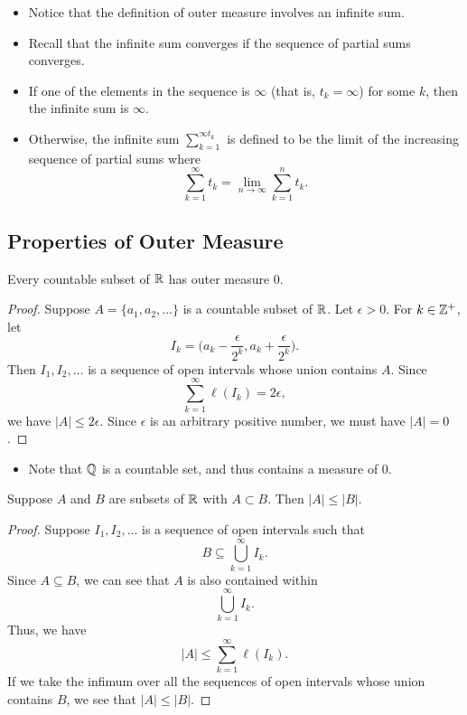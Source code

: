 \documentclass[11pt,a4paper]{book}
\begin{document}
\begin{itemize}
    \item Notice that the definition of outer measure involves an infinite sum.
    \item Recall that the infinite sum converges if the sequence of partial sums converges.
    \item If one of the elements in the sequence is \( \infty  \) (that is, \( {t}_{k} = \infty  \)) for some \( k  \), then the infinite sum is \( \infty  \).
    \item Otherwise, the infinite sum \( \sum_{ k=1  }^{ \infty  {t}_{k} } \) is defined to be the limit of the increasing sequence of partial sums where 
        \[  \sum_{ k=1  }^{ \infty } {t}_{k} = \lim_{ n \to \infty  }  \sum_{ k=1  }^{ n  } {t}_{k}. \]
\end{itemize}

\subsection{Properties of Outer Measure}

\begin{prop}
    Every countable subset of \( \mathbb{R}  \) has outer measure \( 0  \).
\end{prop}
\begin{proof}
Suppose \( A = \{ {a}_{1}, {a}_{2}, \dots  \}  \) is a countable subset of \( \mathbb{R}  \). Let \( \epsilon > 0  \). For \( k \in \mathbb{Z}^{+} \), let 
\[  {I}_{k} = \Big(  {a}_{k} - \frac{ \epsilon }{ 2^{k} } , {a}_{k} + \frac{ \epsilon }{ 2^{k} }  \Big). \]
Then \( {I}_{1}, {I}_{2}, \dots  \) is a sequence of open intervals whose union contains \( A  \). Since 
\[  \sum_{ k=1  }^{ \infty  } \ell({I}_{k}) = 2 \epsilon, \]
we have \( | A  |  \leq 2 \epsilon. \) Since \( \epsilon \) is an arbitrary positive number, we must have \( | A  |  = 0  \).
\end{proof}

\begin{itemize}
    \item Note that \( \mathbb{Q}  \) is a countable set, and thus contains a measure of \( 0  \).
\end{itemize}

\begin{prop}\label{Outer Measure Preserves Order}
   Suppose \( A  \) and \( B  \) are subsets of \( \mathbb{R}  \) with \( A \subset B  \). Then \( | A  |  \leq | B  |  \). 
\end{prop}
\begin{proof}
Suppose  \( {I}_{1}, {I}_{2}, \dots  \) is a sequence of open intervals such that
\[  B \subseteq \bigcup_{ k=1  }^{ \infty  }{I}_{k}. \] 
Since \( A \subseteq  B  \), we can see that \( A  \) is also contained within   
\[  \bigcup_{ k=1  }^{ \infty   }  {I}_{k}. \]
Thus, we have
\[  | A  |  \leq \sum_{ k=1  }^{ \infty  } \ell({I}_{k}). \]
If we take the infimum over all the sequences of open intervals whose union contains \( B  \), we see that \( | A  |  \leq | B  |  \). 
\end{proof}
\end{document}
